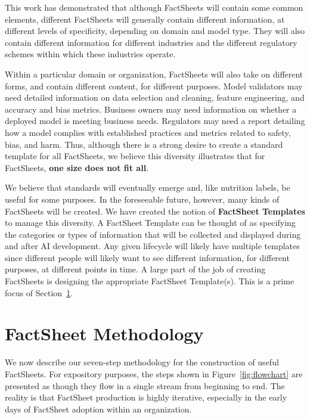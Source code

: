 \documentclass[11pt,dvipdfm]{article}
\begin{document}
This work has demonstrated that although FactSheets will contain some common elements, different FactSheets will generally contain different information, at different levels of specificity, depending on domain and model type. They will also contain different information for different industries and the different regulatory schemes within which these industries operate. 

Within a particular domain or organization, FactSheets will also take on different forms, and contain different content, for different purposes. Model validators may need detailed information on data selection and cleaning, feature engineering, and accuracy and bias metrics. Business owners may need information on whether a deployed model is meeting business needs. Regulators may need a report detailing how a model complies with established practices and metrics related to safety, bias, and harm.
Thus, although there is a strong desire to create a standard template for all FactSheets, we believe this diversity illustrates that for FactSheets, \textbf{one size does not fit all}. 


We believe that standards will eventually emerge and, like nutrition labels, be useful for some purposes. 
In the foreseeable future, however, many kinds of FactSheets will be created. 
We have created the notion of \textbf{FactSheet Templates} to manage this diversity. A FactSheet Template can be thought of as specifying the categories or types of information that will be collected and displayed during and after AI development. Any given lifecycle will likely have multiple templates since different people will likely want to see different information, for different purposes, at different points in time. A large part of the job of creating FactSheets is designing the appropriate FactSheet Template(s). This is a prime focus of Section~\ref{sec-methodology}.



\section{FactSheet Methodology}
\label{sec-methodology}
We now describe our seven-step methodology for the construction of useful FactSheets.
For expository purposes, the steps shown in Figure~\ref{fig:flowchart} are presented as though they flow in a single stream from beginning to end. The reality is that FactSheet production is highly iterative, especially in the early days of FactSheet adoption within an organization.
\end{document}
